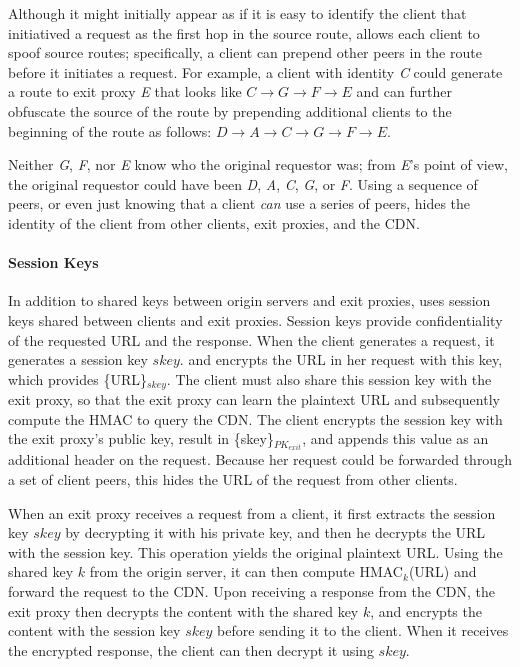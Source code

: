 Although it might initially appear as if it is easy to identify the client
that initiatived a request as the first hop in the source route, \system{}
allows each client to spoof source routes; specifically, a client can prepend
other peers in the route before it initiates a request.  For example, a client
with identity {\it C} could generate a route to exit proxy {\it E} that looks
like $C \rightarrow G \rightarrow F \rightarrow E$ and can further obfuscate
the source of the route by prepending additional clients to the beginning of
the route as follows: $D \rightarrow A \rightarrow C \rightarrow G \rightarrow
F \rightarrow E$.

\noindent Neither {\it G}, {\it F}, nor {\it E} know who the original requestor was; from {\it E}'s point of 
view, the original requestor could have been {\it D}, {\it A}, {\it C}, {\it G},
or {\it F}.  Using a sequence of 
peers, or even just knowing that a client {\it can} use a series of peers, hides
the identity of the client 
from other clients, exit proxies, and the CDN. 

\paragraph{Session Keys}
In addition to shared keys between origin servers and exit proxies, \system{} uses session keys shared 
between clients and exit proxies.  Session keys provide confidentiality of the requested URL and the 
response.  When the client generates a request, it generates a session key $skey$.
and encrypts 
the URL in her request with this key, which provides \{URL\}$_{skey}$.  The client
must also share this session key
with the exit proxy, so that the exit proxy can learn the plaintext URL and subsequently compute the HMAC to 
query the CDN.  The client encrypts the session key with the exit proxy's public key, result in \{skey\}$_{PK_{exit}}$, 
and appends this value as an additional header on the request.  Because her request
could be forwarded through 
a set of client peers, this hides the URL of the request from other clients.

When an exit proxy receives a request from a client, it first extracts the session
key $skey$ by decrypting it with 
his private key, and then he decrypts the URL with the session key.  This operation
yields the original plaintext
URL. Using the shared key $k$ from the origin server, it can then compute
HMAC$_k$(URL) and forward the request 
to the CDN.  Upon receiving a response from the CDN, the exit proxy then decrypts
the content with the shared key $k$, and
encrypts the content with the session key $skey$ before sending it to the client.
When it receives the encrypted response, 
the client can then decrypt it using $skey$.

